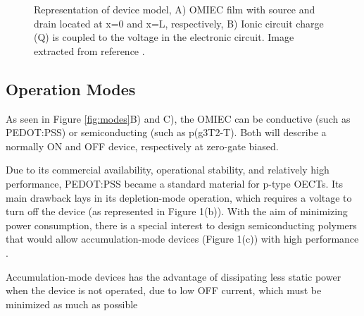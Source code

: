 \begin{figure}[ht]
	\centering
	\caption{Representation of device model, A) OMIEC film with source and drain located at x=0 and x=L, respectively, B) Ionic circuit charge (Q) is coupled to the voltage in the electronic circuit. Image extracted from reference \cite{bernardsSteadyStateTransientBehavior2007}.}
	\label{fig:bernard}
\end{figure}


\subsection{Operation Modes}

As seen in Figure \ref{fig:modes}B) and C), the OMIEC can be conductive (such as PEDOT:PSS) or semiconducting (such as p(g3T2-T). Both will describe a normally ON and OFF device, respectively at zero-gate biased.

Due to its commercial availability, operational stability, and relatively high performance, PEDOT:PSS became a standard material for p-type OECTs. Its main drawback lays in its depletion-mode operation, which requires a voltage to turn off the device (as represented in Figure 1(b)). With the aim of minimizing power consumption, there is a special interest to design semiconducting polymers that would allow accumulation-mode devices (Figure 1(c)) with high performance \cite{nielsenMolecularDesignSemiconducting2016} \cite{tanOrganicMixedIonic2022}.

Accumulation-mode devices has the advantage of dissipating less static power when the device is not operated, due to low OFF current, which must be minimized as much as possible \cite{giovannittiEnergeticControlRedoxActive2020}

